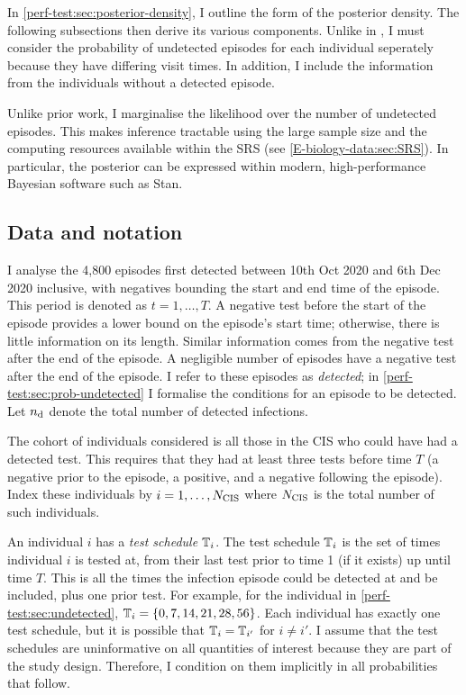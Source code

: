 \documentclass[thesis.tex]{subfiles}
\begin{document}
In \cref{perf-test:sec:posterior-density}, I outline the form of the posterior density.
The following subsections then derive its various components.
Unlike in \textcite{heiseyModelling}, I must consider the probability of undetected episodes for each individual seperately because they have differing visit times.
In addition, I include the information from the individuals without a detected episode.

Unlike prior work, I marginalise the likelihood over the number of undetected episodes.
This makes inference tractable using the large sample size and the computing resources available within the SRS (see \cref{E-biology-data:sec:SRS}).
In particular, the posterior can be expressed within modern, high-performance Bayesian software such as Stan.

\subsection{Data and notation} \label{perf-test:sec:data-notation}

I analyse the 4,800 episodes first detected between 10th Oct 2020 and 6th Dec 2020 inclusive, with negatives bounding the start and end time of the episode.
This period is denoted as $t = 1, \dots, T$.
A negative test before the start of the episode provides a lower bound on the episode's start time; otherwise, there is little information on its length.
Similar information comes from the negative test after the end of the episode.
A negligible number of episodes have a negative test after the end of the episode.
I refer to these episodes as \emph{detected}; in \cref{perf-test:sec:prob-undetected} I formalise the conditions for an episode to be detected.
Let $n_\text{d}$ denote the total number of detected infections.

The cohort of individuals considered is all those in the CIS who could have had a detected test.
This requires that they had at least three tests before time $T$ (a negative prior to the episode, a positive, and a negative following the episode).
Index these individuals by $i = 1, \dots, N_\text{CIS}$ where $N_\text{CIS}$ is the total number of such individuals.

An individual $i$ has a \emph{test schedule} $\mathbb{T}_i$.
The test schedule $\mathbb{T}_i$ is the set of times individual $i$ is tested at, from their last test prior to time 1 (if it exists) up until time $T$.
This is all the times the infection episode could be detected at and be included, plus one prior test.
For example, for the individual in \cref{perf-test:sec:undetected}, $\mathbb{T}_i = \{ 0, 7, 14, 21, 28, 56 \}$.
Each individual has exactly one test schedule, but it is possible that $\mathbb{T}_i = \mathbb{T}_{i'}$ for $i \neq i'$.
I assume that the test schedules are uninformative on all quantities of interest because they are part of the study design.
Therefore, I condition on them implicitly in all probabilities that follow.
\end{document}
